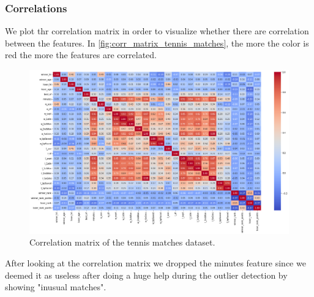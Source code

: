 \subsubsection{Correlations}
We plot thr correlation matrix in order to visualize whether there are correlation between the features. In \autoref{fig:corr_matrix_tennis_matches}, the more the color is red the more the features are correlated.
\begin{figure}[H]
    \centering
    \includegraphics[width= 0.74\linewidth]{images/data_understanding/correlation.png}
    \caption{Correlation matrix of the tennis matches dataset.}
    \label{fig:corr_matrix_tennis_matches}
\end{figure}
After looking at the correlation matrix we dropped the minutes feature since we deemed it as useless after doing a huge help during the outlier detection by showing "inusual matches". 